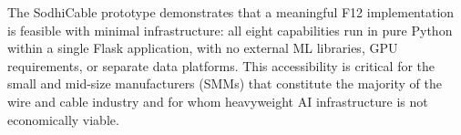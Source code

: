 The SodhiCable prototype demonstrates that a meaningful F12 implementation is
feasible with minimal infrastructure: all eight capabilities run in pure Python
within a single Flask application, with no external ML libraries, GPU
requirements, or separate data platforms.  This accessibility is critical for
the small and mid-size manufacturers (SMMs) that constitute the majority of the
wire and cable industry and for whom heavyweight AI infrastructure is not
economically viable.

